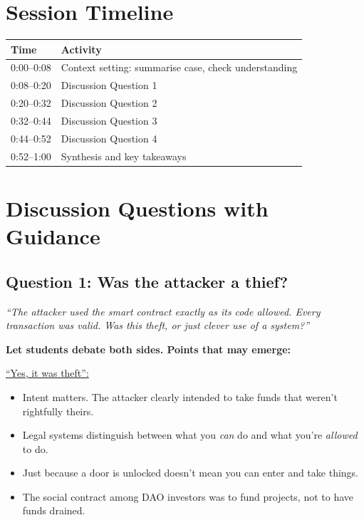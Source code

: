 \documentclass[11pt]{article}
\begin{document}
\newpage


\section*{Session Timeline}

\begin{center}
\begin{tabular}{ll}
\toprule
\textbf{Time} & \textbf{Activity} \\
\midrule
0:00--0:08 & Context setting: summarise case, check understanding \\
0:08--0:20 & Discussion Question 1 \\
0:20--0:32 & Discussion Question 2 \\
0:32--0:44 & Discussion Question 3 \\
0:44--0:52 & Discussion Question 4 \\
0:52--1:00 & Synthesis and key takeaways \\
\bottomrule
\end{tabular}
\end{center}

\section*{Discussion Questions with Guidance}

\subsection*{Question 1: Was the attacker a thief?}

\textit{``The attacker used the smart contract exactly as its code allowed. Every transaction was valid. Was this theft, or just clever use of a system?''}

\medskip
\noindent\textbf{Let students debate both sides. Points that may emerge:}

\medskip
\noindent\underline{``Yes, it was theft'':}
\begin{itemize}[leftmargin=*]
\item Intent matters. The attacker clearly intended to take funds that weren't rightfully theirs.
\item Legal systems distinguish between what you \textit{can} do and what you're \textit{allowed} to do.
\item Just because a door is unlocked doesn't mean you can enter and take things.
\item The social contract among DAO investors was to fund projects, not to have funds drained.
\end{itemize}
\end{document}
